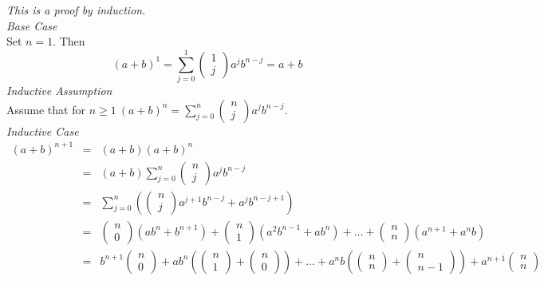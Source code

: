 \documentclass[11pt,a4paper]{article}
\begin{document}
\textit{This is a proof by induction}.\\
\textit{Base Case}\\
Set $n=1$. Then
$$(a+b)^1=\sum\limits_{j=0}^1\begin{pmatrix}1\\j\end{pmatrix}a^jb^{n-j}=a+b$$
\textit{Inductive Assumption}\\
Assume that for $n\geq1\ (a+b)^n=\sum\limits_{j=0}^n\begin{pmatrix}n\\j\end{pmatrix}a^jb^{n-j}$.\\
\textit{Inductive Case}\\
\[\begin{array}{rcl}
(a+b)^{n+1}&=&(a+b)(a+b)^n\\
&=&(a+b)\sum\limits_{j=0}^n\begin{pmatrix}n\\j\end{pmatrix}a^jb^{n-j}\\
&=&\sum\limits_{j=0}^n\left(\begin{pmatrix}n\\j\end{pmatrix}a^{j+1}b^{n-j}+a^jb^{n-j+1}\right)\\
&=&\begin{pmatrix}n\\0\end{pmatrix}(ab^n+b^{n+1})+\begin{pmatrix}n\\1\end{pmatrix}(a^2b^{n-1}+ab^n)+\dots+\begin{pmatrix}n\\n\end{pmatrix}(a^{n+1}+a^nb)\\
&=&b^{n+1}\begin{pmatrix}n\\0\end{pmatrix}+ab^n\left(\begin{pmatrix}n\\1\end{pmatrix}+\begin{pmatrix}n\\0\end{pmatrix}\right)+\dots+a^nb\left(\begin{pmatrix}n\\n\end{pmatrix}+\begin{pmatrix}n\\n-1\end{pmatrix}\right)+a^{n+1}\begin{pmatrix}n\\n\end{pmatrix}\\

\end{array}\]
\end{document}
